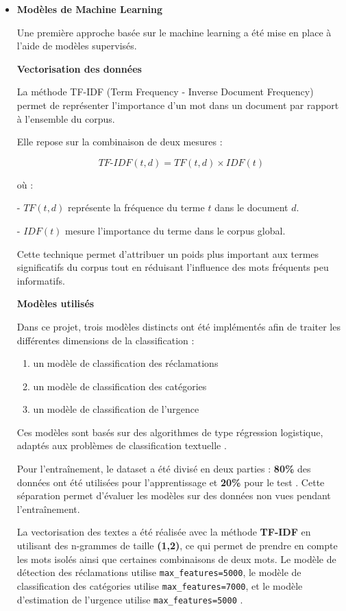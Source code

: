 \documentclass[12pt,a4paper,oneside]{report}
\begin{document}
\begin{itemize}
    \item \textbf{Modèles de Machine Learning}

Une première approche basée sur le machine learning a été mise en place à l’aide de modèles supervisés.

\textbf{Vectorisation des données}

La méthode TF-IDF (Term Frequency - Inverse Document Frequency) \cite{tfidf} permet de représenter
l’importance d’un mot dans un document par rapport à l’ensemble du corpus.

Elle repose sur la combinaison de deux mesures :

\begin{equation}
TF\text{-}IDF(t,d) = TF(t,d) \times IDF(t)
\end{equation}

où :

- \(TF(t,d)\) représente la fréquence du terme \(t\) dans le document \(d\).

- \(IDF(t)\) mesure l’importance du terme dans le corpus global.

Cette technique permet d’attribuer un poids plus important aux termes significatifs du corpus tout en réduisant l’influence des mots fréquents peu informatifs.

\textbf{Modèles utilisés}

Dans ce projet, trois modèles distincts ont été implémentés afin de traiter les différentes dimensions de la classification :

\begin{enumerate}
    \item un modèle de classification des réclamations
    \item un modèle de classification des catégories
    \item un modèle de classification de l’urgence
\end{enumerate}

Ces modèles sont basés sur des algorithmes de type régression logistique, adaptés aux problèmes de classification textuelle \cite{logreg}.

Pour l’entraînement, le dataset a été divisé en deux parties : \textbf{80\%} des données ont été utilisées pour l’apprentissage et \textbf{20\%} pour le test \cite{sklearnsplit}. Cette séparation permet d’évaluer les modèles sur des données non vues pendant l’entraînement.

La vectorisation des textes a été réalisée avec la méthode \textbf{TF-IDF} en utilisant des n-grammes de taille \textbf{(1,2)}, ce qui permet de prendre en compte les mots isolés ainsi que certaines combinaisons de deux mots. Le modèle de détection des réclamations utilise \texttt{max\_features=5000}, le modèle de classification des catégories utilise \texttt{max\_features=7000}, et le modèle d’estimation de l’urgence utilise \texttt{max\_features=5000} \cite{tfidf}.


\end{itemize}
\end{document}
